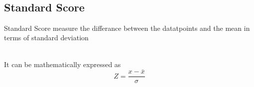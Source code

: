 \documentclass[twoside,12pt]{report}  %
\renewcommand{\thefigure}{\thechapter-\arabic{figure}} %
\begin{document}
\noindent
\\
\subsection{Standard Score}
\begin{tcolorbox}[colback=red!5!white, colframe=red!75!black, title = \textbf{Standard Score}]
	Standard Score measure the differance between the datatpoints and the mean in terms of standard deviation
\end{tcolorbox}
\noindent
\\
It can be mathematically expressed as 
$$ Z = \frac{x-\bar{x}}{\sigma} $$

%
%


\renewcommand{\thechapter}{\Alph{chapter}}
\renewcommand{\thefigure}{\thechapter-\arabic{figure}}
\setcounter{figure}{0}


\appendix
\end{document}
